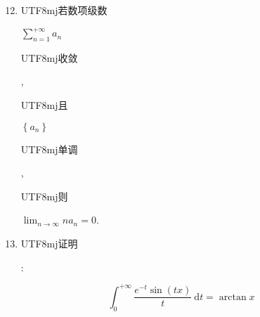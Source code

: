 \documentclass[10pt]{article}
\begin{document}
\begin{enumerate}
  \setcounter{enumi}{11}
  \item \begin{CJK}{UTF8}{mj}若数项级数\end{CJK} $\sum_{n=1}^{+\infty} a_{n}$ \begin{CJK}{UTF8}{mj}收敛\end{CJK}, \begin{CJK}{UTF8}{mj}且\end{CJK} $\left\{a_{n}\right\}$ \begin{CJK}{UTF8}{mj}单调\end{CJK}, \begin{CJK}{UTF8}{mj}则\end{CJK} $\lim _{n \rightarrow \infty} n a_{n}=0$.

  \item \begin{CJK}{UTF8}{mj}证明\end{CJK}:

\end{enumerate}
$$
\int_{0}^{+\infty} \frac{e^{-t} \sin (t x)}{t} \mathrm{~d} t=\arctan x
$$
\end{document}
